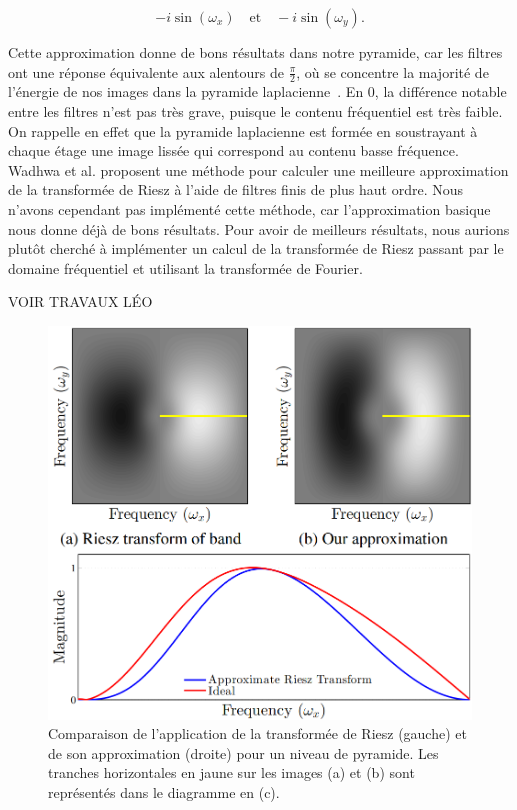 \begin{equation}
    -i\sin(\omega_x) \quad \text{et} \quad -i\sin(\omega_y).
\end{equation}

Cette approximation donne de bons résultats dans notre pyramide, car les filtres ont une réponse équivalente aux alentours de $\frac\pi2$, où se concentre la majorité de l'énergie de nos images dans la pyramide laplacienne~\cite{wadhwa_riesz_2014}. En $0$, la différence notable entre les filtres n'est pas très grave, puisque le contenu fréquentiel est très faible. On rappelle en effet que la pyramide laplacienne est formée en soustrayant à chaque étage une image lissée qui correspond au contenu basse fréquence. Wadhwa et al. proposent une méthode pour calculer une meilleure approximation de la transformée de Riesz à l'aide de filtres finis de plus haut ordre. Nous n'avons cependant pas implémenté cette méthode, car l'approximation basique nous donne déjà de bons résultats. Pour avoir de meilleurs résultats, nous aurions plutôt cherché à implémenter un calcul de la transformée de Riesz passant par le domaine fréquentiel et utilisant la transformée de Fourier.

{\color{red}VOIR TRAVAUX LÉO}


\begin{figure}
    \centering
    \includegraphics[width=.65\textwidth]{contenu/resources/images/riesz_approximation}
    \caption[Approximation de la transformée de Riesz]{Comparaison de l'application de la transformée de Riesz (gauche) et de son approximation (droite) pour un niveau de pyramide. Les tranches horizontales en jaune sur les images (a) et (b) sont représentés dans le diagramme en (c).}
    \label{fig:riesz-approximation}
\end{figure}

